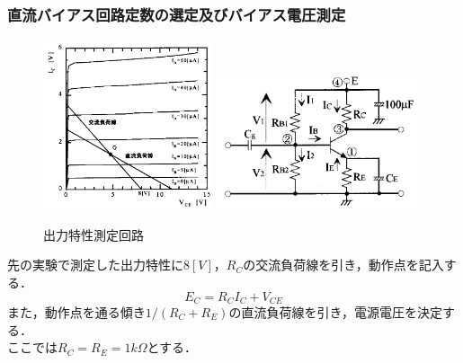 \documentclass[10pt, a4j, dvipdfmx]{jarticle}
\begin{document}
    \newpage
    \subsubsection{直流バイアス回路定数の選定及びバイアス電圧測定}
    \begin{figure}
        \vspace*{-\intextsep}
        \begin{center}
            \includegraphics[height=50mm]{fig-9.png}
            \label{fig:9}
            \includegraphics[height=40mm]{fig-10.png}
            \caption{出力特性測定回路}
            \label{fig:10}
        \end{center}
    \end{figure}
    先の実験で測定した出力特性に$8[V]$，$R_C$の交流負荷線を引き，動作点を記入する．\\ 
    \begin{equation}
        E_C = R_C I_C + V_{CE}
    \end{equation}
    また，動作点を通る傾き$1/(R_C + R_E)$の直流負荷線を引き，電源電圧を決定する．\\
    ここでは$R_C = R_E = 1k\Omega$とする．
\end{document}
